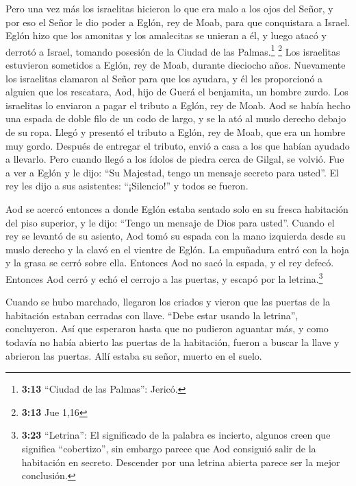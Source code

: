  Pero una vez más los israelitas hicieron lo que era malo
a los ojos del Señor, y por eso el Señor le dio poder a Eglón, rey de
Moab, para que conquistara a Israel.  Eglón hizo que los
amonitas y los amalecitas se unieran a él, y luego atacó y derrotó a
Israel, tomando posesión de la Ciudad de las Palmas.\footnote{\textbf{3:13}
  ``Ciudad de las Palmas'': Jericó.} \footnote{\textbf{3:13} Jue 1,16}
 Los israelitas estuvieron sometidos a Eglón, rey de
Moab, durante dieciocho años.  Nuevamente los israelitas
clamaron al Señor para que los ayudara, y él les proporcionó a alguien
que los rescatara, Aod, hijo de Guerá el benjamita, un hombre zurdo. Los
israelitas lo enviaron a pagar el tributo a Eglón, rey de Moab.
 Aod se había hecho una espada de doble filo de un codo
de largo, y se la ató al muslo derecho debajo de su ropa.
 Llegó y presentó el tributo a Eglón, rey de Moab, que
era un hombre muy gordo.  Después de entregar el tributo,
envió a casa a los que habían ayudado a llevarlo.  Pero
cuando llegó a los ídolos de piedra cerca de Gilgal, se volvió. Fue a
ver a Eglón y le dijo: ``Su Majestad, tengo un mensaje secreto para
usted''. El rey les dijo a sus asistentes: ``¡Silencio!'' y todos se
fueron.

 Aod se acercó entonces a donde Eglón estaba sentado solo
en su fresca habitación del piso superior, y le dijo: ``Tengo un mensaje
de Dios para usted''. Cuando el rey se levantó de su asiento,
 Aod tomó su espada con la mano izquierda desde su muslo
derecho y la clavó en el vientre de Eglón.  La empuñadura
entró con la hoja y la grasa se cerró sobre ella. Entonces Aod no sacó
la espada, y el rey defecó.  Entonces Aod cerró y echó el
cerrojo a las puertas, y escapó por la letrina.\footnote{\textbf{3:23}
  ``Letrina'': El significado de la palabra es incierto, algunos creen
  que significa ``cobertizo'', sin embargo parece que Aod consiguió
  salir de la habitación en secreto. Descender por una letrina abierta
  parece ser la mejor conclusión.}

 Cuando se hubo marchado, llegaron los criados y vieron
que las puertas de la habitación estaban cerradas con llave. ``Debe
estar usando la letrina'', concluyeron.  Así que
esperaron hasta que no pudieron aguantar más, y como todavía no había
abierto las puertas de la habitación, fueron a buscar la llave y
abrieron las puertas. Allí estaba su señor, muerto en el suelo.

